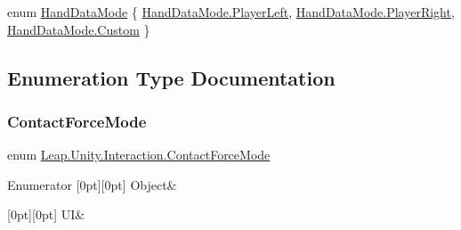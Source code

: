 \begin{DoxyCompactItemize}
enum \mbox{\hyperlink{namespace_leap_1_1_unity_1_1_interaction_ab4a739b7f8a6748903e2ccc029df7a50}{Hand\+Data\+Mode}} \{ \mbox{\hyperlink{namespace_leap_1_1_unity_1_1_interaction_ab4a739b7f8a6748903e2ccc029df7a50a60fc9b6e87d69e5d8adcffb6dd8a9746}{Hand\+Data\+Mode.\+Player\+Left}}, 
\mbox{\hyperlink{namespace_leap_1_1_unity_1_1_interaction_ab4a739b7f8a6748903e2ccc029df7a50ae2f87041e4cb98a6501b9f54ff61b67b}{Hand\+Data\+Mode.\+Player\+Right}}, 
\mbox{\hyperlink{namespace_leap_1_1_unity_1_1_interaction_ab4a739b7f8a6748903e2ccc029df7a50a90589c47f06eb971d548591f23c285af}{Hand\+Data\+Mode.\+Custom}}
 \}
\end{DoxyCompactItemize}


\subsection{Enumeration Type Documentation}
\mbox{\label{namespace_leap_1_1_unity_1_1_interaction_a7a6c3499f7b7d02b0d389e8ac72a315f}} 
\subsubsection{\texorpdfstring{ContactForceMode}{ContactForceMode}}
{\footnotesize\ttfamily enum \mbox{\hyperlink{namespace_leap_1_1_unity_1_1_interaction_a7a6c3499f7b7d02b0d389e8ac72a315f}{Leap.\+Unity.\+Interaction.\+Contact\+Force\+Mode}}\hspace{0.3cm}{\ttfamily [strong]}}

\begin{DoxyEnumFields}{Enumerator}
[0pt][0pt]{}\mbox{\label{namespace_leap_1_1_unity_1_1_interaction_a7a6c3499f7b7d02b0d389e8ac72a315fa497031794414a552435f90151ac3b54b}} 
Object&\\
\hline

[0pt][0pt]{}\mbox{\label{namespace_leap_1_1_unity_1_1_interaction_a7a6c3499f7b7d02b0d389e8ac72a315fa71ff71526d15db86eb50fcac245d183b}} 
UI&\\
\hline

\end{DoxyEnumFields}


